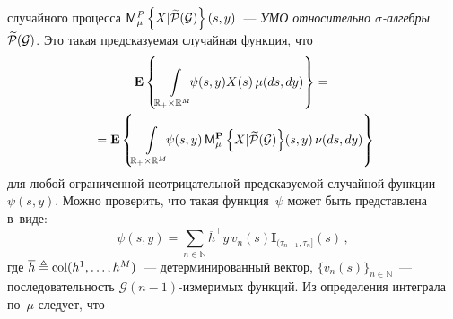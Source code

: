 \begin{multicols}{2}
{ случайного процесса $\mathsf{M}_{ \mu }^{ P }\left\{ \mathop{X|\widetilde{{\mathcal P}}(\mathcal{G})} \right\}(s,y)$~---
 \textit{УМО относительно $\sigma$-ал\-геб\-ры $\widetilde{\mathcal{P}}({\mathcal G})$}.
 Это такая предсказуемая случайная функция, что
\begin{multline}
    \mathbf{E}\left\{\int\limits_{\mathbb{R}_{+}\times \mathbb{R}^M}\!\!\!\psi(s,y)X(s)\,\mu(ds,dy)\right\}={}\\
    {}=
    \mathbf{E}\left\{\int\limits_{\mathbb{R}_{+}\times \mathbb{R}^M}\!\!\!\psi(s,y)\,
    \mmme{\mu}{\mathbf{P}}{X|\widetilde{\mathcal{P}}(\G)}\!(s,y)\,\nu(ds,dy)\right\}\!
    \label{eq:cmemu}
\end{multline}
для любой ограниченной неотрицательной пред\-ска\-зу\-емой случайной
функции ${\psi(s,y)}$. Можно проверить, что такая функция~$\psi$ может быть
представлена в~виде:
\begin{equation*}
 \psi(s,y)=\sum\limits_{n \in \mathbb{N}}
 \overline{h}^{\top}\!y\,v_n(s)\mathbf{I}_{(\tau_{n-1},\tau_n]}(s)\,,
\end{equation*}
где $\overline{h}\triangleq\mathop{\mathrm{col}}(h^1,\ldots,h^M)$~--- детерминированный вектор,
$\{v_n(s)\}_{n \in \mathbb{N}}$~--- последовательность
$\mathcal{G}(n-1)$-из\-ме\-ри\-мых функций.
Из определения интеграла по~$\mu$ следует, что

}
\end{multicols}
